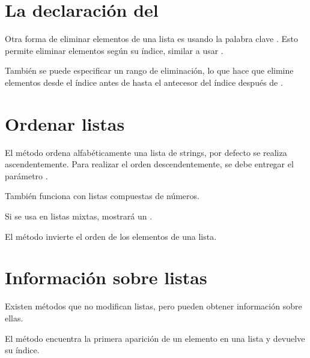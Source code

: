 \section{La declaración del}

Otra forma de eliminar elementos de una lista es usando la palabra clave .
Esto permite eliminar elementos según su índice, similar a usar .


También se puede especificar un rango de eliminación, lo que hace que elimine elementos desde el índice antes de \ttt{:} hasta el antecesor del índice después de \ttt{:}.


\section{Ordenar listas}

El método  ordena alfabéticamente una lista de strings, por defecto se realiza ascendentemente.
Para realizar el orden descendentemente, se debe entregar el parámetro .
  
  
También funciona con listas compuestas de números.


Si se usa en listas mixtas, mostrará un .


El método  invierte el orden de los elementos de una lista.
  

\section{Información sobre listas}

Existen métodos que no modifican listas, pero pueden obtener información sobre ellas.

El método  encuentra la primera aparición de un elemento en una lista y devuelve su índice.
  
